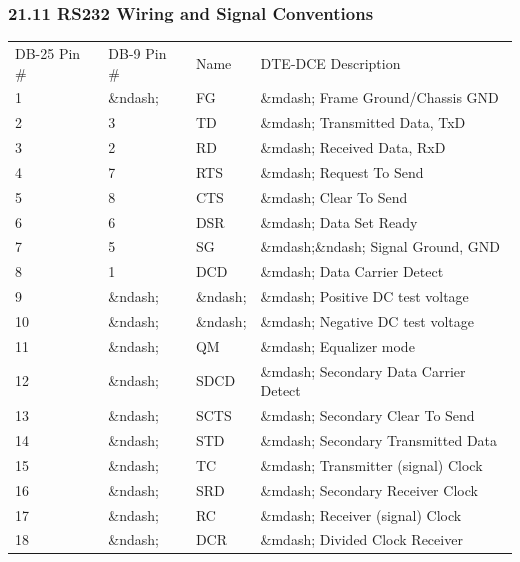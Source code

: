 \label{RS232-Wiring-and-Signal-Conventions}

\subsubsection*{21.11 RS232 Wiring and Signal Conventions}

\label{index-Cables-216}

\begin{longtable}{llll}
{DB-25 Pin \#} & {DB-9 Pin \#} & {Name} & {DTE-DCE Description 
 } \\
{1} & {\&ndash;} & {FG} & {\&mdash; Frame Ground/Chassis GND 
 } \\
{2} & {3} & {TD} & {\&mdash;\gt{} Transmitted Data, TxD 
 } \\
{3} & {2} & {RD} & {\lt{}\&mdash; Received Data, RxD 
 } \\
{4} & {7} & {RTS} & {\&mdash;\gt{} Request To Send 
 } \\
{5} & {8} & {CTS} & {\lt{}\&mdash; Clear To Send 
 } \\
{6} & {6} & {DSR} & {\lt{}\&mdash; Data Set Ready 
 } \\
{7} & {5} & {SG} & {\&mdash;\&ndash; Signal Ground, GND 
 } \\
{8} & {1} & {DCD} & {\lt{}\&mdash; Data Carrier Detect 
 } \\
{9} & {\&ndash;} & {\&ndash;} & {\&mdash; Positive DC test voltage 
 } \\
{10} & {\&ndash;} & {\&ndash;} & {\&mdash; Negative DC test voltage 
 } \\
{11} & {\&ndash;} & {QM} & {\lt{}\&mdash; Equalizer mode 
 } \\
{12} & {\&ndash;} & {SDCD} & {\lt{}\&mdash; Secondary Data Carrier Detect 
 } \\
{13} & {\&ndash;} & {SCTS} & {\lt{}\&mdash; Secondary Clear To Send 
 } \\
{14} & {\&ndash;} & {STD} & {\&mdash;\gt{} Secondary Transmitted Data 
 } \\
{15} & {\&ndash;} & {TC} & {\lt{}\&mdash; Transmitter (signal) Clock 
 } \\
{16} & {\&ndash;} & {SRD} & {\lt{}\&mdash; Secondary Receiver Clock 
 } \\
{17} & {\&ndash;} & {RC} & {\&mdash;\gt{} Receiver (signal) Clock 
 } \\
{18} & {\&ndash;} & {DCR} & {\lt{}\&mdash; Divided Clock Receiver 
}
\end{longtable}
